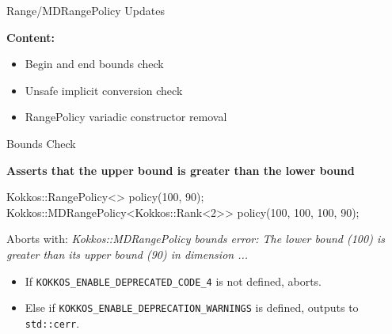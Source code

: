 

\begin{frame}[fragile]

  {\Huge Range/MDRangePolicy Updates}

  \vspace{10pt}

  \textbf{Content:}
  \begin{itemize}
    \item Begin and end bounds check
    \item Unsafe implicit conversion check
    \item RangePolicy variadic constructor removal 
  \end{itemize}

\end{frame}


\begin{frame}[fragile]{Bounds Check}

\textbf{Asserts that the upper bound is greater than the lower bound}

\vspace{10pt}
\begin{code}[keywords={BoundsCheck}]
  Kokkos::RangePolicy<> policy(100, 90);
  Kokkos::MDRangePolicy<Kokkos::Rank<2>> policy({100, 100}, {100, 90});
\end{code}
\vspace{10pt}

Aborts with:
\textit{Kokkos::MDRangePolicy bounds error: The lower bound (100) is greater than its upper bound (90) in dimension ...}
\vspace{10pt}

\begin{itemize}
	\item If \texttt{KOKKOS\_ENABLE\_DEPRECATED\_CODE\_4} is not defined, aborts.
	\item Else if \texttt{KOKKOS\_ENABLE\_DEPRECATION\_WARNINGS} is defined, outputs to \texttt{std::cerr}.
\end{itemize}

\end{frame}


